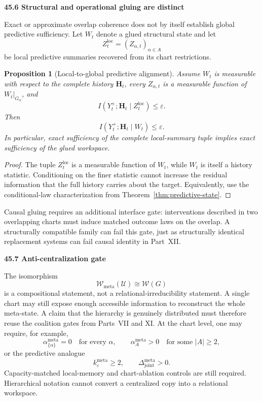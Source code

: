 \documentclass[11pt,letterpaper]{article}
\newcommand{\subtopic}[1]{%
 \vspace{0.45em}
 {\bfseries\color{AccentColor} #1\par}
}
\theoremstyle{plain}
\newtheorem{proposition}[theorem]{Proposition}
\theoremstyle{definition}
\begin{document}
\subtopic{45.6 Structural and operational gluing are distinct}

Exact or approximate overlap coherence does not by itself establish global
predictive sufficiency. Let \(W_t\) denote a glued structural state and let
\[
Z_t^{\mathrm{loc}}
=
(Z_{\alpha,t})_{\alpha\in A}
\]
be local predictive summaries recovered from its chart restrictions.

\begin{proposition}[Local-to-global predictive alignment]\label{prop:local-global-predictive}
Assume \(W_t\) is measurable with respect to the complete history
\(\mathbf H_t\), every \(Z_{\alpha,t}\) is a measurable function of
\(W_t|_{G_\alpha}\), and
\[
I(Y_t^+;\mathbf H_t\mid Z_t^{\mathrm{loc}})
\leq
\varepsilon.
\]
Then
\[
\boxed{
I(Y_t^+;\mathbf H_t\mid W_t)
\leq
\varepsilon.
}
\]
In particular, exact sufficiency of the complete local-summary tuple implies
exact sufficiency of the glued workspace.
\end{proposition}

\begin{proof}
The tuple \(Z_t^{\mathrm{loc}}\) is a measurable function of \(W_t\), while
\(W_t\) is itself a history statistic. Conditioning on the finer statistic
cannot increase the residual information that the full history carries about
the target. Equivalently, use the conditional-law characterization from
Theorem~\ref{thm:predictive-state}.
\end{proof}

Causal gluing requires an additional interface gate: interventions described
in two overlapping charts must induce matched outcome laws on the overlap. A
structurally compatible family can fail this gate, just as structurally
identical replacement systems can fail causal identity in Part~XII.

\subtopic{45.7 Anti-centralization gate}

The isomorphism
\[
\mathscr W_{\mathrm{meta}}(\mathcal U)\cong\mathscr W(G)
\]
is a compositional statement, not a relational-irreducibility statement. A
single chart may still expose enough accessible information to reconstruct the
whole meta-state. A claim that the hierarchy is genuinely distributed must
therefore reuse the coalition gates from Parts~VII and XI. At the chart level,
one may require, for example,
\[
\alpha_{\{\alpha\}}^{\mathrm{meta}}=0
\quad\text{for every }\alpha,
\qquad
\alpha_A^{\mathrm{meta}}>0
\quad\text{for some }|A|\geq2,
\]
or the predictive analogue
\[
k_\varepsilon^{\mathrm{meta}}\geq2,
\qquad
\Delta_{\mathrm{joint}}^{\mathrm{meta}}>0.
\]
Capacity-matched local-memory and chart-ablation controls are still required.
Hierarchical notation cannot convert a centralized copy into a relational
workspace.
\end{document}
